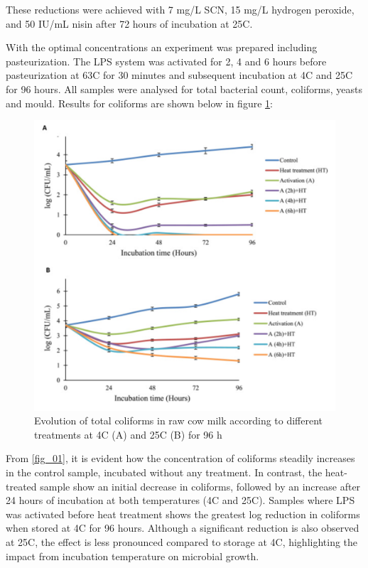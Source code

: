 These reductions were achieved with 7 mg/L SCN, 15 mg/L hydrogen peroxide, and 50 IU/mL nisin after 72 hours of incubation at 25\textdegree C. 

\vline 

With the optimal concentrations an experiment was prepared including pasteurization. The LPS system was activated for 2, 4 and 6 hours before pasteurization at 63\textdegree C for 30 minutes and subsequent incubation at 4\textdegree C and 25\textdegree C for 96 hours. All samples were analysed for total bacterial count, coliforms, yeasts and mould. Results for coliforms are shown below in figure \ref*{fig_02}:

\begin{figure}[h]
    \center
    \includegraphics[width=0.8\linewidth]{Figures/fig_01.png}
    \caption{Evolution of total coliforms in raw cow milk according to different treatments at 4\textdegree C (A) and 25\textdegree C (B) for 96 h \cite{RM_02}}
    \label{fig_02}
\end{figure}

From \ref*{fig_01}, it is evident how the concentration of coliforms steadily increases in the control sample, incubated without any treatment. In contrast, the heat-treated sample show an initial decrease in coliforms, followed by an increase after 24 hours of incubation at both temperatures (4\textdegree C and 25\textdegree C). Samples where LPS was activated before heat treatment shows the greatest log reduction in coliforms when stored at 4\textdegree C for 96 hours. Although a significant reduction is also observed at 25\textdegree C, the effect is less pronounced compared to storage at 4\textdegree C, highlighting the impact from incubation temperature on microbial growth.

